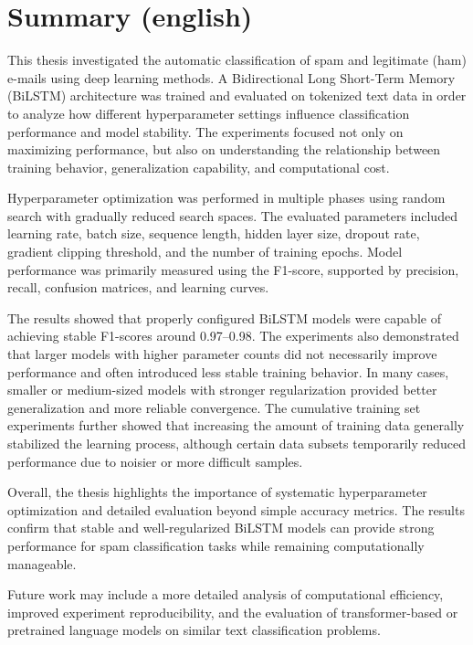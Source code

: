 \section{Summary (english)}

This thesis investigated the automatic classification of spam and legitimate (ham) e-mails using deep learning methods. A Bidirectional Long Short-Term Memory (BiLSTM) architecture was trained and evaluated on tokenized text data in order to analyze how different hyperparameter settings influence classification performance and model stability. The experiments focused not only on maximizing performance, but also on understanding the relationship between training behavior, generalization capability, and computational cost.

Hyperparameter optimization was performed in multiple phases using random search with gradually reduced search spaces. The evaluated parameters included learning rate, batch size, sequence length, hidden layer size, dropout rate, gradient clipping threshold, and the number of training epochs. Model performance was primarily measured using the F1-score, supported by precision, recall, confusion matrices, and learning curves.

The results showed that properly configured BiLSTM models were capable of achieving stable F1-scores around 0.97--0.98. The experiments also demonstrated that larger models with higher parameter counts did not necessarily improve performance and often introduced less stable training behavior. In many cases, smaller or medium-sized models with stronger regularization provided better generalization and more reliable convergence. The cumulative training set experiments further showed that increasing the amount of training data generally stabilized the learning process, although certain data subsets temporarily reduced performance due to noisier or more difficult samples.

Overall, the thesis highlights the importance of systematic hyperparameter optimization and detailed evaluation beyond simple accuracy metrics. The results confirm that stable and well-regularized BiLSTM models can provide strong performance for spam classification tasks while remaining computationally manageable.

Future work may include a more detailed analysis of computational efficiency, improved experiment reproducibility, and the evaluation of transformer-based or pretrained language models on similar text classification problems.